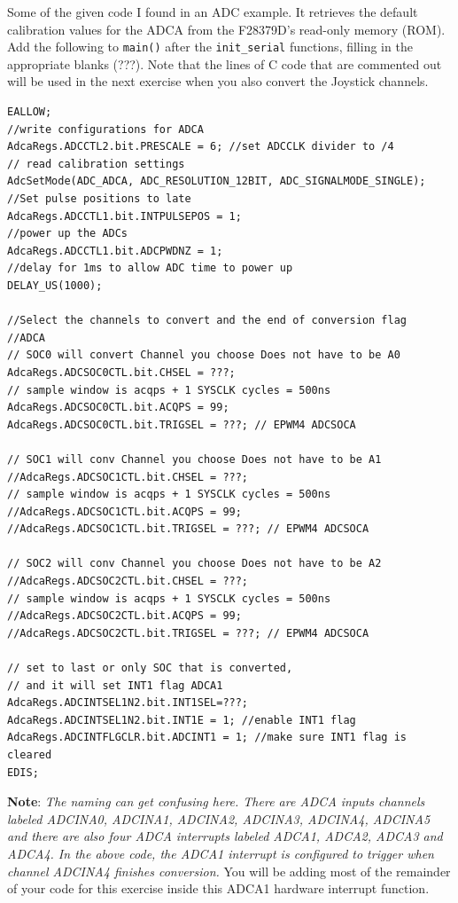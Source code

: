 \documentclass[11pt]{article}
\begin{document}
Some of the given code I found in an ADC example. It retrieves the default calibration values for the ADCA from the F28379D’s read-only memory (ROM). Add the following to \texttt{main()} after the \texttt{init_serial} functions, filling in the appropriate blanks (???). Note that the lines of C code that are commented out will be used in the next exercise when you also convert the Joystick channels.
%
\begin{verbatim}
EALLOW;
//write configurations for ADCA
AdcaRegs.ADCCTL2.bit.PRESCALE = 6; //set ADCCLK divider to /4
// read calibration settings
AdcSetMode(ADC_ADCA, ADC_RESOLUTION_12BIT, ADC_SIGNALMODE_SINGLE);
//Set pulse positions to late
AdcaRegs.ADCCTL1.bit.INTPULSEPOS = 1;
//power up the ADCs
AdcaRegs.ADCCTL1.bit.ADCPWDNZ = 1;
//delay for 1ms to allow ADC time to power up
DELAY_US(1000);

//Select the channels to convert and the end of conversion flag
//ADCA
// SOC0 will convert Channel you choose Does not have to be A0
AdcaRegs.ADCSOC0CTL.bit.CHSEL = ???;
// sample window is acqps + 1 SYSCLK cycles = 500ns
AdcaRegs.ADCSOC0CTL.bit.ACQPS = 99;
AdcaRegs.ADCSOC0CTL.bit.TRIGSEL = ???; // EPWM4 ADCSOCA

// SOC1 will conv Channel you choose Does not have to be A1
//AdcaRegs.ADCSOC1CTL.bit.CHSEL = ???;
// sample window is acqps + 1 SYSCLK cycles = 500ns
//AdcaRegs.ADCSOC1CTL.bit.ACQPS = 99;
//AdcaRegs.ADCSOC1CTL.bit.TRIGSEL = ???; // EPWM4 ADCSOCA

// SOC2 will conv Channel you choose Does not have to be A2
//AdcaRegs.ADCSOC2CTL.bit.CHSEL = ???;
// sample window is acqps + 1 SYSCLK cycles = 500ns
//AdcaRegs.ADCSOC2CTL.bit.ACQPS = 99;
//AdcaRegs.ADCSOC2CTL.bit.TRIGSEL = ???; // EPWM4 ADCSOCA

// set to last or only SOC that is converted,
// and it will set INT1 flag ADCA1
AdcaRegs.ADCINTSEL1N2.bit.INT1SEL=???;
AdcaRegs.ADCINTSEL1N2.bit.INT1E = 1; //enable INT1 flag
AdcaRegs.ADCINTFLGCLR.bit.ADCINT1 = 1; //make sure INT1 flag is cleared
EDIS;
\end{verbatim}
%
\textbf{Note}: \textit{The naming can get confusing here. There are ADCA inputs channels labeled ADCINA0, ADCINA1, ADCINA2, ADCINA3, ADCINA4, ADCINA5 and there are also four ADCA interrupts labeled ADCA1, ADCA2, ADCA3 and ADCA4. In the above code, the ADCA1 interrupt is configured to trigger when channel ADCINA4 finishes conversion.}  You will be adding most of the remainder of your code for this exercise inside this ADCA1 hardware interrupt function.
\end{document}
